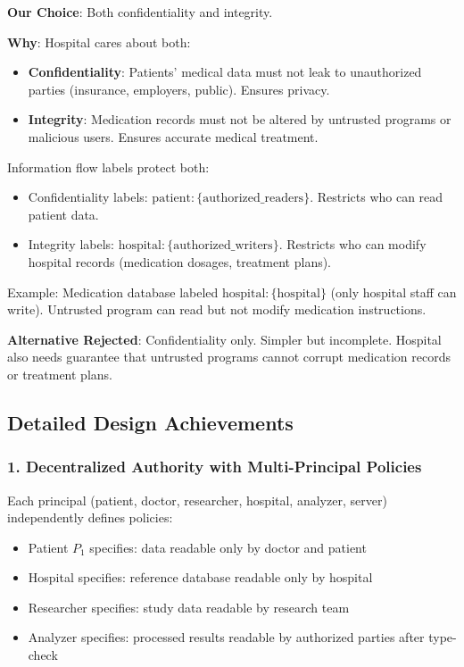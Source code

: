 \textbf{Our Choice}: Both confidentiality and integrity.

\textbf{Why}: Hospital cares about both:
\begin{itemize}
\item \textbf{Confidentiality}: Patients' medical data must not leak to unauthorized parties (insurance, employers, public). Ensures privacy.
\item \textbf{Integrity}: Medication records must not be altered by untrusted programs or malicious users. Ensures accurate medical treatment.
\end{itemize}

Information flow labels protect both:
\begin{itemize}
\item Confidentiality labels: $\text{patient}: \{\text{authorized\_readers}\}$. Restricts who can read patient data.
\item Integrity labels: $\text{hospital}: \{\text{authorized\_writers}\}$. Restricts who can modify hospital records (medication dosages, treatment plans).
\end{itemize}

Example: Medication database labeled $\text{hospital}: \{\text{hospital}\}$ (only hospital staff can write). Untrusted program can read but not modify medication instructions.

\textbf{Alternative Rejected}: Confidentiality only. Simpler but incomplete. Hospital also needs guarantee that untrusted programs cannot corrupt medication records or treatment plans.

\subsection{Detailed Design Achievements}

\subsubsection{1. Decentralized Authority with Multi-Principal Policies}

Each principal (patient, doctor, researcher, hospital, analyzer, server) independently defines policies:
\begin{itemize}
\item Patient $P_1$ specifies: data readable only by doctor and patient
\item Hospital specifies: reference database readable only by hospital
\item Researcher specifies: study data readable by research team
\item Analyzer specifies: processed results readable by authorized parties after type-check
\end{itemize}

